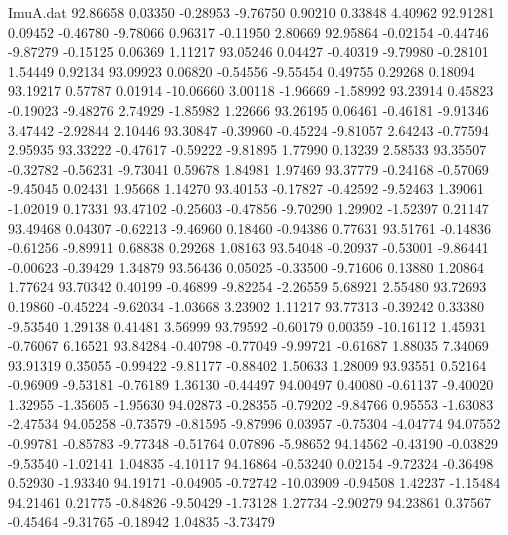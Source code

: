\begin{filecontents}{ImuA.dat}
  92.86658    0.03350   -0.28953   -9.76750    0.90210    0.33848    4.40962
  92.91281    0.09452   -0.46780   -9.78066    0.96317   -0.11950    2.80669
  92.95864   -0.02154   -0.44746   -9.87279   -0.15125    0.06369    1.11217
  93.05246    0.04427   -0.40319   -9.79980   -0.28101    1.54449    0.92134
  93.09923    0.06820   -0.54556   -9.55454    0.49755    0.29268    0.18094
  93.19217    0.57787    0.01914  -10.06660    3.00118   -1.96669   -1.58992
  93.23914    0.45823   -0.19023   -9.48276    2.74929   -1.85982    1.22666
  93.26195    0.06461   -0.46181   -9.91346    3.47442   -2.92844    2.10446
  93.30847   -0.39960   -0.45224   -9.81057    2.64243   -0.77594    2.95935
  93.33222   -0.47617   -0.59222   -9.81895    1.77990    0.13239    2.58533
  93.35507   -0.32782   -0.56231   -9.73041    0.59678    1.84981    1.97469
  93.37779   -0.24168   -0.57069   -9.45045    0.02431    1.95668    1.14270
  93.40153   -0.17827   -0.42592   -9.52463    1.39061   -1.02019    0.17331
  93.47102   -0.25603   -0.47856   -9.70290    1.29902   -1.52397    0.21147
  93.49468    0.04307   -0.62213   -9.46960    0.18460   -0.94386    0.77631
  93.51761   -0.14836   -0.61256   -9.89911    0.68838    0.29268    1.08163
  93.54048   -0.20937   -0.53001   -9.86441   -0.00623   -0.39429    1.34879
  93.56436    0.05025   -0.33500   -9.71606    0.13880    1.20864    1.77624
  93.70342    0.40199   -0.46899   -9.82254   -2.26559    5.68921    2.55480
  93.72693    0.19860   -0.45224   -9.62034   -1.03668    3.23902    1.11217
  93.77313   -0.39242    0.33380   -9.53540    1.29138    0.41481    3.56999
  93.79592   -0.60179    0.00359  -10.16112    1.45931   -0.76067    6.16521
  93.84284   -0.40798   -0.77049   -9.99721   -0.61687    1.88035    7.34069
  93.91319    0.35055   -0.99422   -9.81177   -0.88402    1.50633    1.28009
  93.93551    0.52164   -0.96909   -9.53181   -0.76189    1.36130   -0.44497
  94.00497    0.40080   -0.61137   -9.40020    1.32955   -1.35605   -1.95630
  94.02873   -0.28355   -0.79202   -9.84766    0.95553   -1.63083   -2.47534
  94.05258   -0.73579   -0.81595   -9.87996    0.03957   -0.75304   -4.04774
  94.07552   -0.99781   -0.85783   -9.77348   -0.51764    0.07896   -5.98652
  94.14562   -0.43190   -0.03829   -9.53540   -1.02141    1.04835   -4.10117
  94.16864   -0.53240    0.02154   -9.72324   -0.36498    0.52930   -1.93340
  94.19171   -0.04905   -0.72742  -10.03909   -0.94508    1.42237   -1.15484
  94.21461    0.21775   -0.84826   -9.50429   -1.73128    1.27734   -2.90279
  94.23861    0.37567   -0.45464   -9.31765   -0.18942    1.04835   -3.73479

\end{filecontents}
